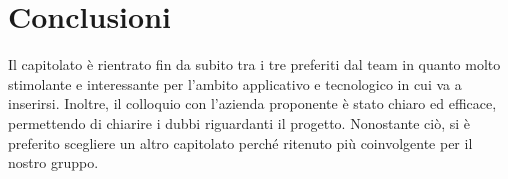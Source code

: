 \documentclass[12pt]{report}
\begin{document}
\section{Conclusioni}
Il capitolato è rientrato fin da subito tra i tre preferiti dal team in quanto molto stimolante e interessante per l’ambito applicativo e tecnologico in cui va a inserirsi. Inoltre, il colloquio con l’azienda proponente è stato chiaro ed eﬀicace, permettendo di chiarire i dubbi riguardanti il progetto. Nonostante ciò, si è preferito scegliere un altro capitolato perché ritenuto più coinvolgente per il nostro gruppo.
\end{document}
